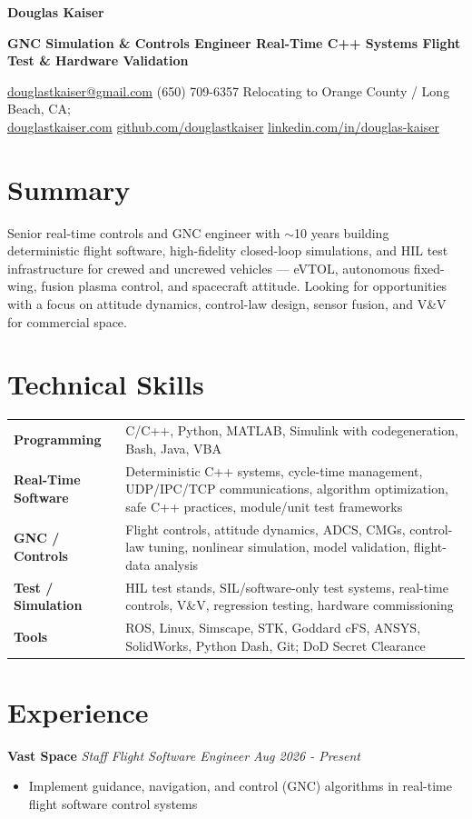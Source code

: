 \documentclass[10pt,letterpaper]{extarticle}
\newcommand{\name}[1]{\begin{center}{\LARGE\bfseries\color{accent} #1}\end{center}\vspace{-10pt}}
\newcommand{\tagline}[1]{\begin{center}{\footnotesize\bfseries #1}\end{center}\vspace{-10pt}}
\newcommand{\contact}[1]{\begin{center}{\scriptsize\color{muted} #1}\end{center}\vspace{-10pt}}
\newcommand{\role}[4]{%
  \textbf{#1} \textbar{} \textit{#3} \hfill {\color{muted}\if\relax\detokenize{#2}\relax\else\textit{#2} \textbar{} \fi\textit{#4}}\par\vspace{-2pt}%
}
\newcommand{\skillrow}[2]{\textbf{#1} & #2\\}
\begin{document}
\small
\name{Douglas Kaiser}
\tagline{GNC Simulation \& Controls Engineer \textbar{} Real-Time C++ Systems \textbar{} Flight Test \& Hardware Validation}
\contact{\href{mailto:douglastkaiser@gmail.com}{douglastkaiser@gmail.com} \;\textbar\; (650) 709-6357 \;\textbar\; Relocating to Orange County / Long Beach, CA;\\
\href{https://www.douglastkaiser.com}{douglastkaiser.com} \;\textbar\; \href{https://github.com/douglastkaiser}{github.com/douglastkaiser} \;\textbar\; \href{https://www.linkedin.com/in/douglas-kaiser}{linkedin.com/in/douglas-kaiser}}
\section{Summary}
Senior real-time controls and GNC engineer with $\sim$10 years building deterministic flight software, high-fidelity closed-loop simulations, and HIL test infrastructure for crewed and uncrewed vehicles --- eVTOL, autonomous fixed-wing, fusion plasma control, and spacecraft attitude. Looking for opportunities with a focus on attitude dynamics, control-law design, sensor fusion, and V\&V for commercial space.

\section{Technical Skills}
\begin{tabularx}{\textwidth}{>{\raggedright\arraybackslash}p{1.34in}X}
\skillrow{Programming}{C/C++, Python, MATLAB, Simulink with codegeneration, Bash, Java, VBA}
\skillrow{Real-Time Software}{Deterministic C++ systems, cycle-time management, UDP/IPC/TCP communications, algorithm optimization, safe C++ practices, module/unit test frameworks}
\skillrow{GNC / Controls}{Flight controls, attitude dynamics, ADCS, CMGs, control-law tuning, nonlinear simulation, model validation, flight-data analysis}
\skillrow{Test / Simulation}{HIL test stands, SIL/software-only test systems, real-time controls, V\&V, regression testing, hardware commissioning}
\skillrow{Tools}{ROS, Linux, Simscape, STK, Goddard cFS, ANSYS, SolidWorks, Python Dash, Git; DoD Secret Clearance}
\end{tabularx}

\section{Experience}
\role{Vast Space}{}{Staff Flight Software Engineer}{Aug 2026 - Present}
\begin{itemize}
  \item Implement guidance, navigation, and control (GNC) algorithms in real-time flight software control systems
\end{itemize}
\end{document}
